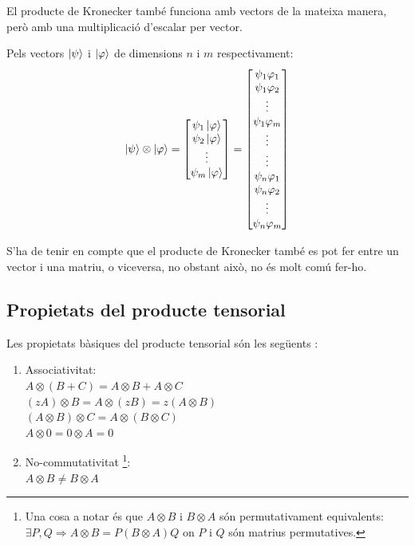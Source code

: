 El producte de Kronecker també funciona amb vectors de la mateixa manera, però amb una multiplicació d'escalar per vector.

Pels vectors $\ket{\psi}$ i $\ket{\varphi}$ de dimensions $n$ i $m$ respectivament:
$$
\ket{\psi} \otimes \ket{\varphi} = \begin{bmatrix}
	\psi_{1} \ket{\varphi} \\
	\psi_2 \ket{\varphi} \\
	\vdots \\
	\psi_{m} \ket{\varphi}
\end{bmatrix} = 
\begin{bmatrix}
\psi_{1} \varphi_1 \\
\psi_{1} \varphi_{2} \\
\vdots \\
\psi_{1} \varphi_{m} \\
\vdots \\
\vdots \\
\psi_{n} \varphi_1 \\
\psi_{n} \varphi_{2} \\
\vdots \\
\psi_{n} \varphi_{m} \\
\end{bmatrix}
$$

S'ha de tenir en compte que el producte de Kronecker també es pot fer entre un vector i una matriu, o viceversa, no obstant això, no és molt comú fer-ho.

\subsection{Propietats del producte tensorial}
Les propietats bàsiques del producte tensorial són les següents \cite{QCandQI:tensor_product, wiki:tensor_product}:
\begin{enumerate}
	\item Associativitat: \\ $A \otimes (B + C) = A \otimes B + A \otimes C$ \\
	$ (zA) \otimes B = A \otimes (zB) = z(A \otimes B)$\\
	$ (A \otimes B) \otimes C = A \otimes (B\otimes C)$ \\
	$A \otimes 0 = 0 \otimes A = 0 $
	\item No-commutativitat \footnote{Una cosa a notar és que $A \otimes B$ i $B \otimes A$ són 
	permutativament equivalents: \\ $\exists P, Q \Rightarrow A \otimes B = P (  B \otimes A )Q$ on $P$ i $Q$ són matrius permutatives.  }: \\
	$A \otimes B \neq B \otimes A $
\end{enumerate}



